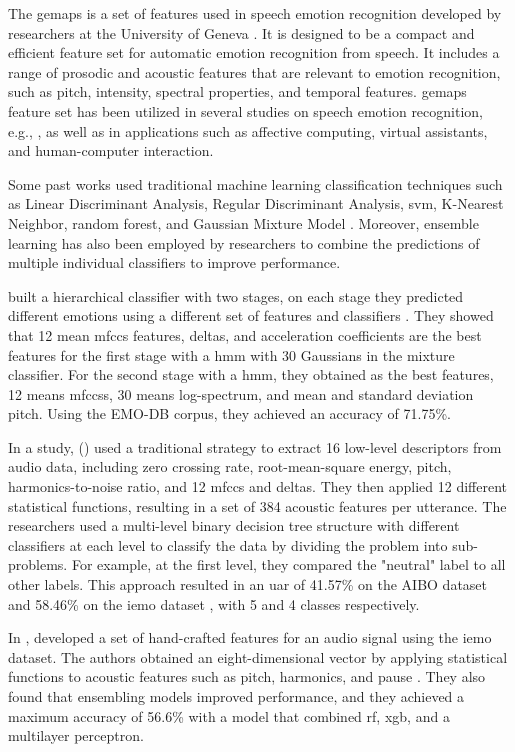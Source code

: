 The \ac{gemaps} is a set of features used in speech emotion recognition developed by researchers at the University of Geneva \cite{Eyben2016}. It is designed to be a compact and efficient feature set for automatic emotion recognition from speech. It includes a range of prosodic and acoustic features that are relevant to emotion recognition, such as pitch, intensity, spectral properties, and temporal features. \ac{gemaps} feature set has been utilized in several studies on speech emotion recognition, e.g., \cite{Tarantino2019}, as well as in applications such as affective computing, virtual assistants, and human-computer interaction.

Some past works used traditional machine learning classification techniques such as Linear Discriminant Analysis, Regular Discriminant Analysis, \ac{svm}, K-Nearest Neighbor, \ac{random forest}, and Gaussian Mixture Model \cite{Kuchibhotla2014}. Moreover, ensemble learning has also been employed by researchers to combine the predictions of multiple individual classifiers to improve performance.

\citeauthor{Albornoz2011} built a hierarchical classifier with two stages, on each stage they predicted different emotions using a different set of features and classifiers \cite{Albornoz2011}. They showed that 12 mean \ac{mfccs} features, deltas, and acceleration coefficients are the best features for the first stage with a \ac{hmm} with 30 Gaussians in the mixture classifier. For the second stage with a \ac{hmm}, they obtained as the best features, 12 means \acp{mfccs}, 30 means log-spectrum, and mean and standard deviation pitch. Using the EMO-DB corpus, they achieved an accuracy of 71.75\%.

In a study, \citeauthor{Lee2011} (\citeyear{Lee2011}) used a traditional strategy to extract 16 low-level descriptors from audio data, including zero crossing rate, root-mean-square energy, pitch, harmonics-to-noise ratio, and 12 \ac{mfccs} and deltas. They then applied 12 different statistical functions, resulting in a set of 384 acoustic features per utterance. The researchers used a multi-level binary decision tree structure with different classifiers at each level to classify the data by dividing the problem into sub-problems. For example, at the first level, they compared the "neutral" label to all other labels. This approach resulted in an \ac{uar} of 41.57\% on the AIBO dataset and 58.46\% on the \ac{iemo} dataset \cite{Lee2011}, with 5 and 4 classes respectively.

In \citeyear{HandCraftedSahu}, \citeauthor{HandCraftedSahu} developed a set of hand-crafted features for an audio signal using the \ac{iemo} dataset. The authors obtained an eight-dimensional vector by applying statistical functions to acoustic features such as pitch, harmonics, and pause \cite{HandCraftedSahu}. They also found that ensembling models improved performance, and they achieved a maximum accuracy of 56.6\% with a model that combined \ac{rf}, \ac{xgb}, and a multilayer perceptron.

